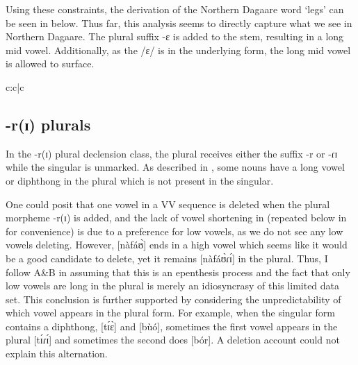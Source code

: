 \documentclass[output=paper,colorlinks,citecolor=brown,
]{langscibook}
\begin{document}
Using these constraints, the derivation of the Northern Dagaare word `legs' can be seen in  below. Thus far, this analysis seems to directly capture what we see in Northern Dagaare. The plural suffix -ɛ is added to the stem, resulting in a long mid vowel. Additionally, as the /ɛ/ is in the underlying form, the long mid vowel is allowed to surface.

\begin{table}

  \caption{Tableau deriving [g͡bɛ́ɛ́] `legs' in ND}
  \label{tab:Caragine:legs}
  
\begin{tableau}{c:c|c} 
  \vio{} \vio{}  \vio{*}
 \vio{*!} \vio{}  \vio{}  
 \vio{*!} \vio{}  \vio{}  
 \vio{} \vio{*!}  \vio{}  
\end{tableau}
\end{table}

\subsection{-r(ɪ) plurals} \label{sec:caragine:rianalysis}
\largerpage
In the -r(ɪ) plural declension class, the plural receives either the suffix -r or -ɾɪ while the singular is unmarked. As described in , some nouns have a long vowel or diphthong in the plural which is not present in the singular. 

One could posit that one vowel in a VV sequence is deleted when the plural morpheme -r(ɪ) is added, and the lack of vowel shortening in  (repeated below in  for convenience) is due to a preference for low vowels, as we do not see any low vowels deleting. However, [nàfáʊ̀] ends in a high vowel which seems like it would be a good candidate to delete, yet it remains [nàfáʊ̀ɾɪ́] in the plural. Thus, I follow A\&B in assuming that this is an epenthesis process and the fact that only low vowels are long in the plural is merely an idiosyncrasy of this limited data set. This conclusion is further supported by considering the unpredictability of which vowel appears in the plural form. For example, when the singular form contains a diphthong, [tɪ́ɛ̀] and [bùó], sometimes the first vowel appears in the plural [tɪ́ɾɪ́] and sometimes the second does [bór]. A deletion account could not explain this alternation.
\end{document}
